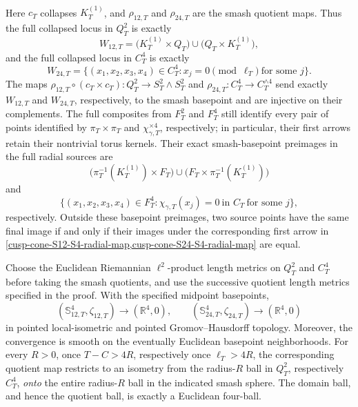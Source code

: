 \begin{theorem}
\begin{align}
\end{align}
Here \(c_T\) collapses \(K_T^{(1)}\), and \(\rho_{12,T}\) and
\(\rho_{24,T}\) are the smash quotient maps.  Thus the
full collapsed locus in \(Q_T^2\) is exactly
\begin{equation}
 W_{12,T}
 =\bigl(K_T^{(1)}\times Q_T\bigr)
  \cup\bigl(Q_T\times K_T^{(1)}\bigr),
 \label{cusp-cone-S12-exact-collapsed-locus}
\end{equation}
and the full collapsed locus in \(C_T^4\) is exactly
\begin{equation}
 W_{24,T}
 =\{(x_1,x_2,x_3,x_4)\in C_T^4:
       x_j=0\pmod{\ell_T}\ \text{for some }j\}.
 \label{cusp-cone-S24-exact-collapsed-locus}
\end{equation}
The maps
\(\rho_{12,T}\circ(c_T\times c_T):Q_T^2\to
S_T^2\wedge S_T^2\) and
\(\rho_{24,T}:C_T^4\to C_T^{\wedge4}\) send exactly \(W_{12,T}\) and
\(W_{24,T}\), respectively, to the smash basepoint and are injective on
their complements.  The full composites from \(F_T^2\) and \(F_T^4\)
still identify every pair of points identified by
\(\pi_T\times\pi_T\) and \(\chi_{\gamma,T}^{\times4}\), respectively; in
particular, their first arrows retain their nontrivial torus kernels.
Their exact smash-basepoint preimages in the full radial sources are
\[
 \bigl(\pi_T^{-1}(K_T^{(1)})\times F_T\bigr)
 \cup\bigl(F_T\times\pi_T^{-1}(K_T^{(1)})\bigr)
\]
and
\[
 \{(x_1,x_2,x_3,x_4)\in F_T^4:
   \chi_{\gamma,T}(x_j)=0\ \text{in }C_T\ \text{for some }j\},
\]
respectively.  Outside these basepoint preimages, two source points have the
same final image if and only if their images under the corresponding first
arrow in \cref{cusp-cone-S12-S4-radial-map,cusp-cone-S24-S4-radial-map}
are equal.

Choose the Euclidean Riemannian \(\ell^2\)-product length metrics on
\(Q_T^2\) and \(C_T^4\) before taking the smash quotients, and use the
successive quotient length metrics specified in the proof.  With the
specified midpoint basepoints,
\begin{equation}
 (\mathbb S_{12,T}^4,\zeta_{12,T})
 \longrightarrow(\mathbb R^4,0),
 \qquad
 (\mathbb S_{24,T}^4,\zeta_{24,T})
 \longrightarrow(\mathbb R^4,0)
 \label{cusp-cone-moving-S4-R4-limits}
\end{equation}
in pointed local-isometric and pointed Gromov--Hausdorff topology.  Moreover,
the convergence is smooth on the eventually Euclidean basepoint
neighborhoods.  For every \(R>0\), once \(T-C>4R\), respectively once
\(\ell_T>4R\), the corresponding quotient map restricts to an isometry from
the radius-\(R\) ball in \(Q_T^2\), respectively \(C_T^4\), \emph{onto} the
entire radius-\(R\) ball in the indicated smash sphere.  The domain ball, and
hence the quotient ball, is exactly a Euclidean four-ball.
\end{theorem}

